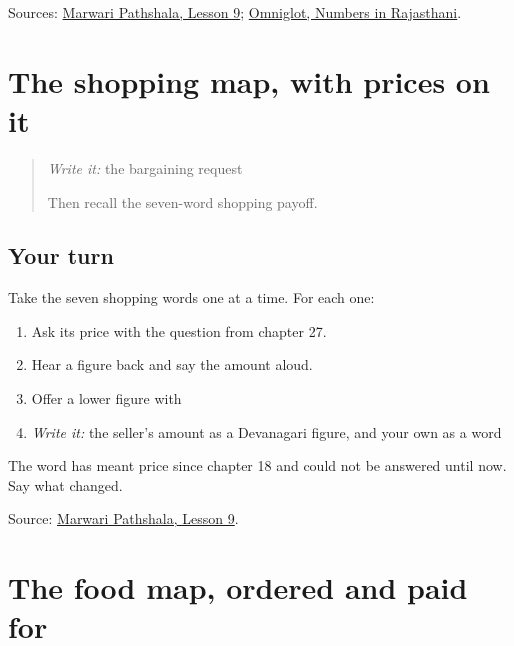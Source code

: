 \begin{tcolorbox}[breakable,colback=teal!4,colframe=teal!35!black,title={Before you move on}]
Sources: \href{https://www.marwaripathshala.com/marwari-lesson-9-english}{Marwari Pathshala, Lesson 9}; \href{https://www.omniglot.com/language/numbers/rajasthani.htm}{Omniglot, Numbers in Rajasthani}.
\end{tcolorbox}
\section[Practice]{The shopping map, with prices on it}

\label{lesson:MW-R36-shopping-numbered}



\begin{quote}
\emph{Write it:} the bargaining request

Then recall the seven-word shopping payoff.
\end{quote}

\subsection*{Your turn}
Take the seven shopping words one at a time. For each one:

\begin{enumerate}
\raggedright
  \item Ask its price with the question from chapter 27.
  \item Hear a figure back and say the amount aloud.
  \item Offer a lower figure with \textbf{}
  \item \emph{Write it:} the seller's amount as a Devanagari figure, and your own as a word
\end{enumerate}

The word \textbf{} has meant price since chapter 18 and could not be answered until now. Say what changed.

\begin{tcolorbox}[breakable,colback=teal!4,colframe=teal!35!black,title={Before you move on}]
Source: \href{https://www.marwaripathshala.com/marwari-lesson-9-english}{Marwari Pathshala, Lesson 9}.
\end{tcolorbox}
\section[Practice]{The food map, ordered and paid for}

